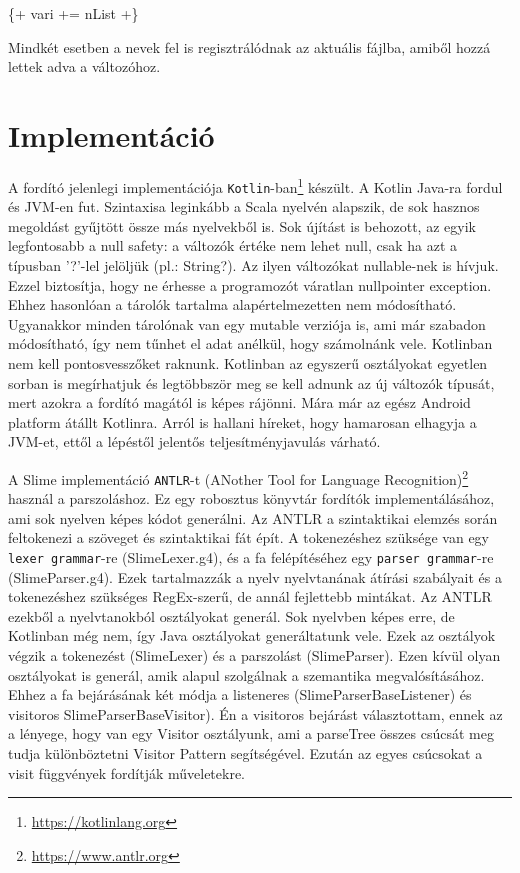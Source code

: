 {\{+ vari += nList +\}

Mindkét esetben a nevek fel is regisztrálódnak az aktuális fájlba, amiből hozzá lettek adva a változóhoz.

\section{Implementáció}
\label{sec:SImplementation}
A fordító jelenlegi implementációja \texttt{Kotlin}-ban\footnote{\url{https://kotlinlang.org}} készült.
A Kotlin Java-ra fordul és JVM-en fut.
Szintaxisa leginkább a Scala nyelvén alapszik, de sok hasznos megoldást gyűjtött össze más nyelvekből is.
Sok újítást is behozott, az egyik legfontosabb a null safety: a változók értéke nem lehet null, csak ha azt a típusban '?'-lel jelöljük (pl.: String?).
Az ilyen változókat nullable-nek is hívjuk.
Ezzel biztosítja, hogy ne érhesse a programozót váratlan nullpointer exception.
Ehhez hasonlóan a tárolók tartalma alapértelmezetten nem módosítható.
Ugyanakkor minden tárolónak van egy mutable verziója is, ami már szabadon módosítható, így nem tűnhet el adat anélkül, hogy számolnánk vele.
Kotlinban nem kell pontosvesszőket raknunk.
Kotlinban az egyszerű osztályokat egyetlen sorban is megírhatjuk és legtöbbször meg se kell adnunk az új változók típusát, mert azokra a fordító magától is képes rájönni.
Mára már az egész Android platform átállt Kotlinra.
Arról is hallani híreket, hogy hamarosan elhagyja a JVM-et, ettől a lépéstől jelentős teljesítményjavulás várható.

A Slime implementáció \texttt{ANTLR}-t (ANother Tool for Language Recognition)\footnote{\url{https://www.antlr.org}} használ a parszoláshoz.
Ez egy robosztus könyvtár fordítók implementálásához, ami sok nyelven képes kódot generálni. 
Az ANTLR a szintaktikai elemzés során feltokenezi a szöveget és szintaktikai fát épít. 
A tokenezéshez szüksége van egy \texttt{lexer grammar}-re (SlimeLexer.g4), és a fa felépítéséhez egy \texttt{parser grammar}-re (SlimeParser.g4). 
Ezek tartalmazzák a nyelv nyelvtanának átírási szabályait és a tokenezéshez szükséges RegEx-szerű, de annál fejlettebb mintákat. 
Az ANTLR ezekből a nyelvtanokból osztályokat generál. 
Sok nyelvben képes erre, de Kotlinban még nem, így Java osztályokat generáltatunk vele. 
Ezek az osztályok végzik a tokenezést (SlimeLexer) és a parszolást (SlimeParser). 
Ezen kívül olyan osztályokat is generál, amik alapul szolgálnak a  szemantika megvalósításához. 
Ehhez a fa bejárásának két módja a listeneres (SlimeParserBaseListener) és visitoros SlimeParserBaseVisitor).
Én a visitoros bejárást választottam, ennek az a lényege, hogy van egy Visitor osztályunk, ami a parseTree összes csúcsát meg tudja különböztetni Visitor Pattern segítségével.
Ezután az egyes csúcsokat a visit függvények fordítják műveletekre.

}
